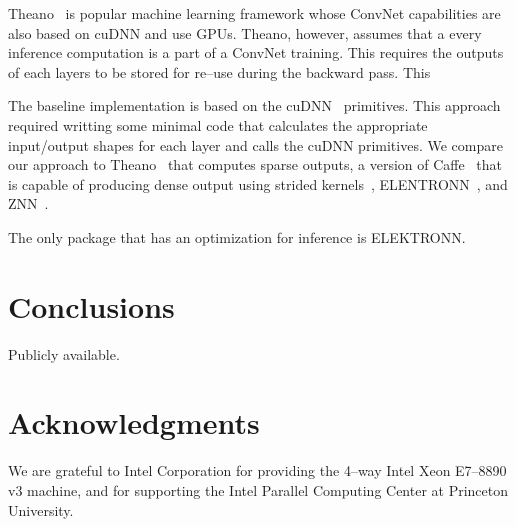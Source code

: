 \documentclass[conference]{./IEEEtran/IEEEtran}
\begin{document}
  Theano~\cite{bergstra2010theano} is popular machine learning
  framework whose ConvNet capabilities are also based on cuDNN and use
  GPUs.  Theano, however, assumes that a every inference computation
  is a part of a ConvNet training.  This requires the outputs of each
  layers to be stored for re--use during the backward pass.  This

  The baseline implementation is based on the
  cuDNN~\cite{chetlur2014cudnn} primitives.  This approach required
  writting some minimal code that calculates the appropriate
  input/output shapes for each layer and calls the cuDNN primitives.
  We compare our approach to Theano~\cite{bergstra2010theano} that
  computes sparse outputs, a version of Caffe~\cite{jia2014caffe} that
  is capable of producing dense output using strided
  kernels~\cite{tschopp2015efficient}, ELENTRONN~\cite{ELEKTRONN2015},
  and ZNN~\cite{zlateski2015znn}.

  The only package that has an optimization for inference is
  ELEKTRONN.


\section{Conclusions}

  Publicly available.

\section{Acknowledgments}
We are grateful to Intel Corporation for providing the 4–way Intel
Xeon E7–8890 v3 machine, and for supporting the Intel Parallel
Computing Center at Princeton University.






\end{document}
